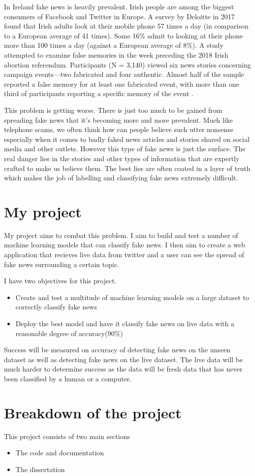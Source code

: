 In Ireland fake news is heavily prevalent. Irish people are among the biggest consumers of Facebook and Twitter in Europe. A survey by Deloitte in 2017 found that Irish adults look at their mobile phone 57 times a day (in comparison to a European average of 41 times). Some 16\% admit to looking at their phone more than 100 times a day (against a European average of 8\%). A study attempted to examine false memories in the week preceding the 2018 Irish abortion referendum. Participants (N = 3,140) viewed six news stories concerning campaign events—two fabricated and four authentic. Almost half of the sample reported a false memory for at least one fabricated event, with more than one third of participants reporting a specific memory of the event \cite{murphy2019false}.

This problem is getting worse. There is just too much to be gained from spreading fake news that it's becoming more and more prevalent. Much like telephone scams, we often think how can people believe such utter nonsense especially when it comes to badly faked news articles and stories shared on social media and other outlets. However this type of fake news is just the surface. The real danger lies in the stories and other types of information that are expertly crafted to make us believe them. The best lies are often coated in a layer of truth which makes the job of labelling and classifying fake news extremely difficult.

\section{My project}
My project aims to combat this problem. I aim to build and test a number of machine learning models that can classify fake news. I then aim to create a web application that recieves live data from twitter and a user can see the spread of fake news surrounding a certain topic.

I have two objectives for this project.
\begin{itemize}
  \item Create and test a multitude of machine learning models on a large dataset to correctly classify fake news
  \item Deploy the best model and have it classify fake news on live data with a reasonable degree of accuracy(90\%)
\end{itemize}

Success will be measured on accuracy of detecting fake news on the unseen dataset as well as detecting fake news on the live dataset. The live data will be much harder to determine success as the data will be fresh data that has never been classified by a human or a computer.

\section{Breakdown of the project}

This project consists of two main sections

\begin{itemize}
	\item The code and documentation
	\item The dissertation
\end{itemize}

\

